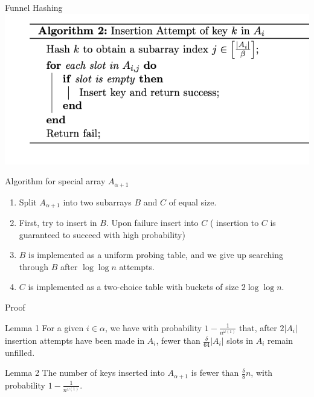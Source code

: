 \documentclass{beamer}
\begin{document}
\begin{frame}{Funnel Hashing}
	\includegraphics{insertion-attempt}
\end{frame}


\begin{frame}{Algorithm for special array $A_{\alpha + 1}$}
	\begin{enumerate}
		\item Split $A_{\alpha + 1}$ into two subarrays $B$ and $C$ of equal size. 
		\item First, try to insert in $B$. Upon failure insert into $C$ ( insertion to $C$ is guaranteed to succeed with high probability)
		\item $B$ is implemented as a uniform probing table, and we give up searching through $B$ after $\log{\log{n}}$ attempts.
		\item $C$ is implemented as a two-choice table with buckets of size $2\log{\log{n}}$. 
	\end{enumerate}
	
\end{frame}

\begin{frame}{Proof}
	\begin{block}{Lemma 1}
		For a given $i \in \alpha$, we have with probability $1 - \frac{1}{n^{\omega(1)}}$ that, after $2|A_i|$ insertion attempts have been made in $A_i$, fewer than $\frac{\delta}{64} |A_i|$ slots in $A_i$ remain unfilled.
	\end{block}

	\begin{block}{Lemma 2}
		The number of keys inserted into $A_{\alpha + 1}$ is fewer than $\frac{\delta}{8}n$, with probability $1 - \frac{1}{n^{\omega(1)}}$.
	\end{block}

\end{frame}
\end{document}
